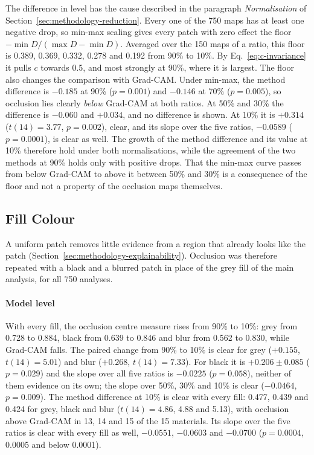 The difference in level has the cause described in the paragraph
\emph{Normalisation} of Section~\ref{sec:methodology-reduction}. Every one of the 750
maps has at least one negative drop, so min-max scaling gives every patch with zero
effect the floor $-\min D / (\max D - \min D)$. Averaged over the 150 maps of a ratio,
this floor is 0.389, 0.369, 0.332, 0.278 and 0.192 from 90\% to 10\%. By
Eq.~\eqref{eq:c-invariance} it pulls $c$ towards 0.5, and most strongly at 90\%, where
it is largest.
The floor also changes the comparison with Grad-CAM. Under min-max, the method
difference is $-0.185$ at 90\% ($p = 0.001$) and $-0.146$ at 70\% ($p = 0.005$), so
occlusion lies clearly \emph{below} Grad-CAM at both ratios. At 50\% and 30\% the
difference is $-0.060$ and $+0.034$, and no difference is shown. At 10\% it is
$+0.314$ ($t(14) = 3.77$, $p = 0.002$), clear, and its slope over the five ratios,
$-0.0589$ ($p = 0.0001$), is clear as well. The growth of the method difference and its
value at 10\% therefore hold under both normalisations, while the agreement of the two
methods at 90\% holds only with positive drops. That the min-max curve passes from
below Grad-CAM to above it between 50\% and 30\% is a consequence of the floor and not
a property of the occlusion maps themselves.

\subsection{Fill Colour}
\label{sec:results-fill}

A uniform patch removes little evidence from a region that already looks like the
patch (Section~\ref{sec:methodology-explainability}).
Occlusion was therefore repeated with a black and a blurred patch in place of the grey
fill of the main analysis, for all 750 analyses.
\paragraph{Model level}
With every fill, the occlusion centre measure rises from 90\% to 10\%: grey from 0.728
to 0.884, black from 0.639 to 0.846 and blur from 0.562 to 0.830, while Grad-CAM
falls. The paired change from 90\% to
10\% is clear for grey ($+0.155$, $t(14) = 5.01$) and blur ($+0.268$,
$t(14) = 7.33$). For black it is $+0.206 \pm 0.085$ ($p = 0.029$) and the slope over
all five ratios is $-0.0225$ ($p = 0.058$), neither of them evidence on its own; the
slope over 50\%, 30\% and 10\% is clear ($-0.0464$, $p = 0.009$). The method difference at 10\% is clear with every fill: 0.477, 0.439 and
0.424 for grey, black and blur ($t(14) = 4.86$, 4.88 and 5.13), with occlusion above
Grad-CAM in 13, 14 and 15 of the 15 materials. Its slope over the five ratios is clear
with every fill as well, $-0.0551$, $-0.0603$ and $-0.0700$ ($p = 0.0004$, 0.0005 and
below 0.0001).

